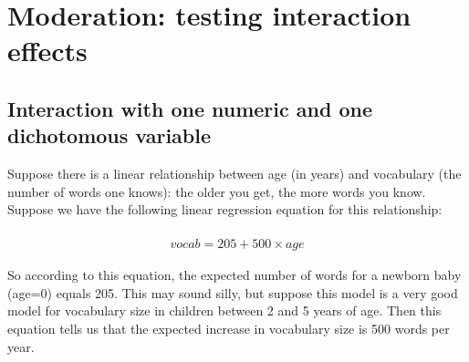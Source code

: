 \documentclass[]{book}\usepackage[]{graphicx}\usepackage[]{color}
\begin{document}
% 
% 
% 
% 
% 
% 
% 
% 
% 
% 





\chapter{Moderation: testing interaction effects}\label{chap:moderation}





\section{Interaction with one numeric and one dichotomous variable}

Suppose there is a linear relationship between age (in years) and vocabulary (the number of words one knows): the older you get, the more words you know. Suppose we have the following linear regression equation for this relationship:


\begin{eqnarray}
\widehat{vocab} = 205 + 500 \times age 
\end{eqnarray}

So according to this equation, the expected number of words for a newborn baby (age=0) equals 205. This may sound silly, but suppose this model is a very good model for vocabulary size in children between 2 and 5 years of age. Then this equation tells us that the expected increase in vocabulary size is 500 words per year.
\end{document}
